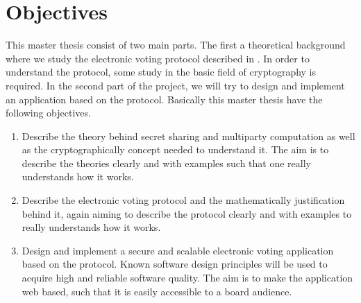 \section{Objectives}
This master thesis consist of two main parts. The first a theoretical background where we study the electronic voting protocol described in \cite{Schoenmakers1999}. In order to understand the protocol, some study in the basic field of cryptography is required. In the second part of the project, we will try to design and implement an application based on the protocol. Basically this master thesis have the following objectives. 

\begin{enumerate}
    \item   Describe the theory behind secret sharing and multiparty computation as well as the cryptographically concept needed to understand it. The aim is to describe the theories clearly and with examples such that one really understands how it works. 
            
    \item   Describe the electronic voting protocol \cite{Schoenmakers1999} and the mathematically justification behind it, again aiming to describe the protocol clearly and with examples to really understands how it works.
    
    \item   Design and implement a secure and scalable electronic voting application based on the protocol. Known software design principles will be used to acquire high and reliable software quality.
    The aim is to make the application web based, such that it is easily accessible to a board audience.
\end{enumerate}



